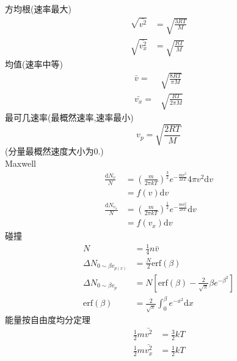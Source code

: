 \documentclass[10pt]{article}
\numberwithin{equation}{section}
\begin{document}
\begin{multicols}{3}
\begin{CJK}{UTF8}{gbsn}
方均根(速率最大)
\begin{align}
  \sqrt{\bar{v^2}} &=\sqrt{\frac{3RT}{M}} \\
  \sqrt{\bar{v_x^2}} &=\sqrt{\frac{RT}{M}}
\end{align}
均值(速率中等)
\begin{align}
  \bar{v}= & \sqrt{\frac{8RT}{\pi M}} \\
  \bar{v_x}= & \sqrt{\frac{RT}{2\pi M}}
\end{align}
最可几速率(最概然速率,速率最小)
\begin{equation}
  v_p=\sqrt{\frac{2RT}{M}}
\end{equation}
(分量最概然速度大小为0.) \\
Maxwell
\begin{align}\nonumber
  \frac{\textrm{d}N_v}{N} &=\left(\frac{m}{2\pi kT}\right)^{\frac{3}{2}}e^{-\frac{mv^2}{2kT}}4\pi v^2 \textrm{d}v \nonumber \\ &=f(v)\textrm{d}v \\
  \frac{\textrm{d}N_{v_x}}{N} &=\left(\frac{m}{2\pi kT}\right)^{\frac{1}{2}}e^{-\frac{mv_x^2}{2kT}} \textrm{d}v \nonumber \\&=f(v_x)\textrm{d}v
\end{align}
碰撞
\begin{align}
N&=\frac{1}{4}n\bar{v}\\
\Delta N_{0\sim\beta v_{p(x)}}&=\frac{N}{2} \textrm{erf} \left(\beta\right)\\
\Delta N_{0\sim \beta v_{p}}&=N\left[ \textrm{erf} (\beta)-\frac{2}{\sqrt\pi}\beta e^{-\beta^2}\right] \\
\textrm{erf} \left(\beta\right)&=\frac{2}{\sqrt\pi}\int_{0}^{\beta}{e^{-x^2}\textrm{d}x}
\end{align}
能量按自由度均分定理
\begin{align}
  \frac{1}{2}m\bar{v^2}&=\frac{3}{2}kT \\
  \frac{1}{2}m\bar{v_x^2}&=\frac{1}{2}kT
\end{align}

\end{CJK}
\end{multicols}
\end{document}
